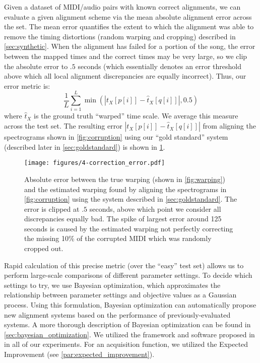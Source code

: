 Given a dataset of MIDI/audio pairs with known correct alignments, we can evaluate a given alignment scheme via the mean absolute alignment error across the set.
The mean error quantifies the extent to which the alignment was able to remove the timing distortions (random warping and cropping) described in \cref{sec:synthetic}.
When the alignment has failed for a portion of the song, the error between the mapped times and the correct times may be very large, so we clip the absolute error to $.5$ seconds (which essentially denotes an error threshold above which all local alignment discrepancies are equally incorrect).  Thus, our error metric is:
\begin{equation}
\frac{1}{L}\sum_{i = 1}^{L} \min(|t_X[p[i]] - \hat{t}_X[q[i]]|, 0.5)
\end{equation}
where $\hat{t}_X$ is the ground truth ``warped'' time scale.  We average this measure across the test set.
The resulting error $|t_X[p[i]] - \hat{t}_X[q[i]]|$ from aligning the spectrograms shown in \cref{fig:corruption} using our ``gold standard'' system (described later in \cref{sec:goldstandard}) is shown in \cref{fig:correction_error}.

\begin{figure}
  \centering
  \texttt{[image: figures/4-correction\_error.pdf]}
  \caption[Absolute error from correcting synthetic warping]{Absolute error between the true warping (shown in \cref{fig:warping}) and the estimated warping found by aligning the spectrograms in \cref{fig:corruption} using the system described in \cref{sec:goldstandard}.
The error is clipped at $.5$ seconds, above which point we consider all discrepancies equally bad.
The spike of largest error around 125 seconds is caused by the estimated warping not perfectly correcting the missing 10\% of the corrupted MIDI which was randomly cropped out.}
  \label{fig:correction_error}
\end{figure}

Rapid calculation of this precise metric (over the ``easy'' test set) allows us to perform large-scale comparisons of different parameter settings.
To decide which settings to try, we use Bayesian optimization, which approximates the relationship between parameter settings and objective values as a Gaussian process.
Using this formulation, Bayesian optimization can automatically propose new alignment systems based on the performance of previously-evaluated systems.
A more thorough description of Bayesian optimization can be found in \cref{sec:bayesian_optimization}.
We utilized the framework and software proposed in \cite{snoek2012practical} in all of our experiments.
For an acquisition function, we utilized the Expected Improvement (see \cref{par:expected_improvement}).

